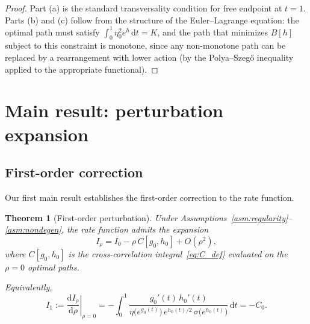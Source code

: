 \documentclass[11pt]{article}
\newtheorem{theorem}{Theorem}
\theoremstyle{definition}
\newcommand{\dd}{\mathrm{d}}
\begin{document}
\begin{proof}
Part (a) is the standard transversality condition for free endpoint at $t=1$. Parts (b) and (c) follow from the structure of the Euler--Lagrange equation: the optimal path must satisfy $\int_0^1 \eta_0^2 e^{h}\,\dd t = K$, and the path that minimizes $B[h]$ subject to this constraint is monotone, since any non-monotone path can be replaced by a rearrangement with lower action (by the Polya--Szeg\H{o} inequality applied to the appropriate functional).
\end{proof}

\section{Main result: perturbation expansion}\label{sec:main}

\subsection{First-order correction}\label{sec:first_order}

Our first main result establishes the first-order correction to the rate function.

\begin{theorem}[First-order perturbation]\label{thm:main}
Under Assumptions~\ref{asm:regularity}--\ref{asm:nondegen}, the rate function admits the expansion
\begin{equation}\label{eq:first_order}
  I_\rho = I_0 - \rho\, C[g_0, h_0] + O(\rho^2),
\end{equation}
where $C[g_0, h_0]$ is the cross-correlation integral~\eqref{eq:C_def} evaluated on the $\rho = 0$ optimal paths.

Equivalently,
\begin{equation}\label{eq:I1}
  I_1 := \left.\frac{\dd I_\rho}{\dd\rho}\right|_{\rho=0}
  = -\int_0^1 \frac{g_0'(t)\,h_0'(t)}{\eta\bigl(e^{g_0(t)}\bigr)\,e^{h_0(t)/2}\,\sigma\bigl(e^{h_0(t)}\bigr)}\,\dd t = -C_0.
\end{equation}
\end{theorem}
\end{document}
